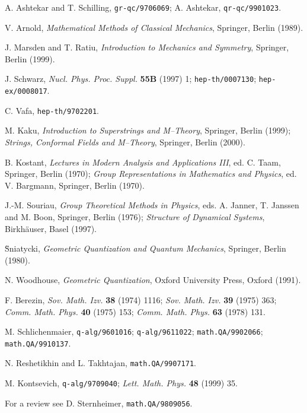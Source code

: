 \documentclass[a4paper,a4paper]{article}
\begin{document}
\begin{thebibliography}{99}

A. Ashtekar and T. Schilling, {\tt gr-qc/9706069};
A. Ashtekar, {\tt qr-qc/9901023}.

V. Arnold, {\it Mathematical Methods of Classical Mechanics}, Springer, Berlin (1989).

J. Marsden and T. Ratiu, {\it Introduction to Mechanics and Symmetry}, Springer, Berlin (1999).

J. Schwarz, {\it Nucl. Phys. Proc. Suppl.} {\bf 55B} (1997) 1;
{\tt hep-th/0007130}; {\tt hep-ex/0008017}.

C. Vafa, {\tt hep-th/9702201}.

M. Kaku, {\it Introduction to Superstrings and M--Theory}, Springer, 
Berlin (1999); {\it Strings, Conformal Fields and M--Theory}, Springer, 
Berlin (2000).

B. Kostant, {\it Lectures in Modern Analysis and Applications III}, ed. C. Taam, 
Springer, Berlin (1970);
{\it Group Representations in Mathematics and Physics}, ed.  V. Bargmann,  Springer, Berlin (1970).

J.-M. Souriau, {\it Group Theoretical Methods in Physics}, eds.  A. Janner, T. Janssen and M.
Boon, Springer, Berlin (1976);
{\it Structure of Dynamical Systems}, Birkh\"auser, Basel (1997).

\`Sniatycki, {\it Geometric Quantization and Quantum Mechanics}, 
Springer, Berlin (1980).

N. Woodhouse, {\it Geometric Quantization}, Oxford University Press, Oxford (1991).

F. Berezin, {\it Sov. Math. Izv.} {\bf 38} (1974) 1116; {\it Sov. Math. Izv.} {\bf 39} (1975) 363;
{\it Comm. Math. Phys.} {\bf 40} (1975) 153;
{\it Comm. Math. Phys.} {\bf 63} (1978) 131.

M. Schlichenmaier, {\tt q-alg/9601016}; {\tt q-alg/9611022};
{\tt math.QA/9902066}; {\tt math.QA/9910137}.

N. Reshetikhin and L. Takhtajan, {\tt math.QA/9907171}.

M. Kontsevich, {\tt q-alg/9709040};  {\it Lett. Math. Phys.} {\bf 48} (1999) 35.

For a review see D. Sternheimer, {\tt math.QA/9809056}.


\end{thebibliography}
\end{document}
